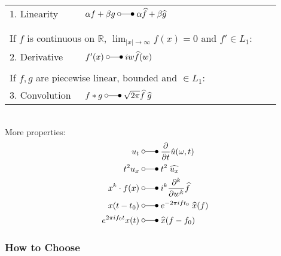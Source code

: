 \begin{tabular}[h]{p{0.25\linewidth} p{0.65\linewidth}}
    1. Linearity   & $\alpha f+\beta g\;\laplace\;\alpha\widehat{f}+\beta\widehat{g}$                                     \\
                   &                                                                                                      \\
                   &                                                                                                      \\
    \multicolumn{2}{p{0.9\linewidth}}{If $f$ is continuous on $\mathbb{R}$, $\lim_{|x|\to\infty}f(x)=0$ and $f'\in L_1$:} \\
    2. Derivative  & $f^{\prime}(x)\;\laplace\;iw\widehat{f}(w)$                                                          \\
                   &                                                                                                      \\
    \multicolumn{2}{p{0.9\linewidth}}{If $f,g$ are piecewise linear, bounded and $\in L_1$:}                              \\
    3. Convolution & $f*g\;\laplace\;\sqrt{2\pi}\widehat{f}\;\widehat{g}$                                                 \\
\end{tabular}\vspace*{8pt}\\
More properties:
\begin{align*}
    u_t                & \;\laplace\;\frac\partial{\partial t}\hat{u}(\omega,t)     \\
    t^2u_x             & \;\laplace\; t^2\;\widehat{u_x}                            \\
    x^k\cdot f(x)      & \;\laplace\;i^k \frac{\partial^k}{\partial w^k}\widehat{f} \\
    x(t-t_0)           & \;\laplace\; e^{-2\pi ift_0}\;\widehat{x}(f)               \\
    e^{2\pi if_0t}x(t) & \;\laplace\; \widehat{x}(f-f_0)
\end{align*}

\subsubsection{How to Choose}

